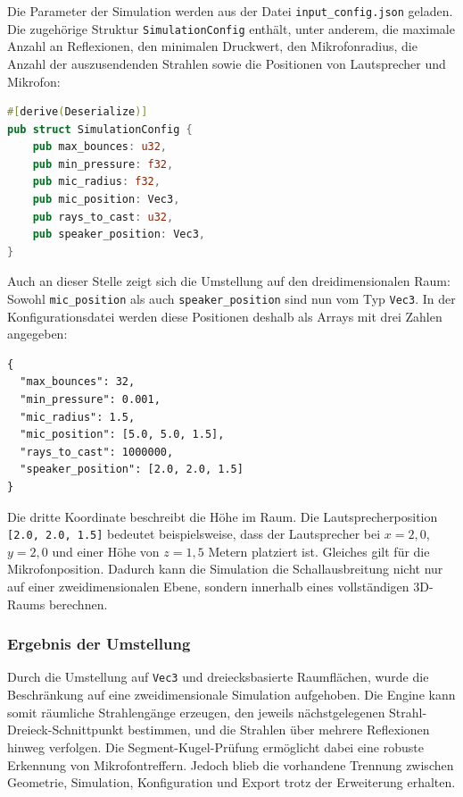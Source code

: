 Die Parameter der Simulation werden aus der Datei \texttt{input\_config.json} geladen.
Die zugehörige Struktur \texttt{SimulationConfig} enthält, unter anderem, die maximale Anzahl an
Reflexionen, den minimalen Druckwert, den Mikrofonradius, die Anzahl der
auszusendenden Strahlen sowie die Positionen von Lautsprecher und Mikrofon:

\begin{lstlisting}[language=Rust]
#[derive(Deserialize)]
pub struct SimulationConfig {
    pub max_bounces: u32,
    pub min_pressure: f32,
    pub mic_radius: f32,
    pub mic_position: Vec3,
    pub rays_to_cast: u32,
    pub speaker_position: Vec3,
}
\end{lstlisting}

Auch an dieser Stelle zeigt sich die Umstellung auf den dreidimensionalen Raum:
Sowohl \texttt{mic\_position} als auch \texttt{speaker\_position} sind nun vom
Typ \texttt{Vec3}. In der Konfigurationsdatei werden diese Positionen deshalb
als Arrays mit drei Zahlen angegeben:

\begin{lstlisting}
{
  "max_bounces": 32,
  "min_pressure": 0.001,
  "mic_radius": 1.5,
  "mic_position": [5.0, 5.0, 1.5],
  "rays_to_cast": 1000000,
  "speaker_position": [2.0, 2.0, 1.5]
}
\end{lstlisting}

Die dritte Koordinate beschreibt die Höhe im Raum. Die Lautsprecherposition
\texttt{[2.0, 2.0, 1.5]} bedeutet beispielsweise, dass der Lautsprecher bei
\(x = 2{,}0\), \(y = 2{,}0\) und einer Höhe von \(z = 1{,}5\) Metern platziert
ist. Gleiches gilt für die Mikrofonposition. Dadurch kann die Simulation die
Schallausbreitung nicht nur auf einer zweidimensionalen Ebene, sondern innerhalb
eines vollständigen 3D-Raums berechnen.

\subsubsection{Ergebnis der Umstellung}
\label{subsubsec:3d_result}

Durch die Umstellung auf \texttt{Vec3} und dreiecksbasierte Raumflächen, wurde
die Beschränkung auf eine zweidimensionale Simulation aufgehoben.
Die Engine kann somit räumliche Strahlengänge erzeugen, den jeweils nächstgelegenen
Strahl-Dreieck-Schnittpunkt bestimmen, und die Strahlen über mehrere Reflexionen hinweg verfolgen.
Die Segment-Kugel-Prüfung ermöglicht dabei eine robuste Erkennung von Mikrofontreffern.
Jedoch blieb die vorhandene Trennung zwischen Geometrie, Simulation, Konfiguration und Export trotz der Erweiterung erhalten.

